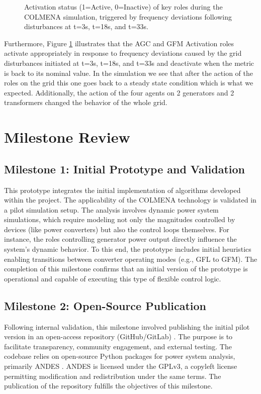 \documentclass{article}
\begin{document}
\begin{figure}[h!]
    \caption{Activation status (1=Active, 0=Inactive) of key roles during the COLMENA simulation, triggered by frequency deviations following disturbances at t=3s, t=18s, and t=33s.}
    \label{fig:activation_plots}
\end{figure}
    
Furthermore, Figure \ref{fig:activation_plots} illustrates that the AGC and GFM Activation roles activate appropriately in response to frequency deviations caused by the grid disturbances initiated at t=3s, t=18s, and t=33s and deactivate when the metric is back to its nominal value. In the simulation we see that after the action of the roles on the grid this one goes back to a steady state condition which is what we expected. Additionally, the action of the four agents on 2 generators and 2 transformers changed the behavior of the whole grid. 

\section{Milestone Review}

\subsection*{Milestone 1: Initial Prototype and Validation}

This prototype integrates the initial implementation of algorithms developed within the project. The applicability of the COLMENA technology is validated in a pilot simulation setup. The analysis involves dynamic power system simulations, which require modeling not only the magnitudes controlled by devices (like power converters) but also the control loops themselves. For instance, the roles controlling generator power output directly influence the system's dynamic behavior. To this end, the prototype includes initial heuristics enabling transitions between converter operating modes (e.g., GFL to GFM). The completion of this milestone confirms that an initial version of the prototype is operational and capable of executing this type of flexible control logic.

\subsection*{Milestone 2: Open-Source Publication}

Following internal validation, this milestone involved publishing the initial pilot version in an open-access repository (GitHub/GitLab) \cite{git:eroots}. The purpose is to facilitate transparency, community engagement, and external testing. The codebase relies on open-source Python packages for power system analysis, primarily ANDES \cite{article:andes}. ANDES is licensed under the GPLv3, a copyleft license permitting modification and redistribution under the same terms. The publication of the repository fulfills the objectives of this milestone.
\end{document}
